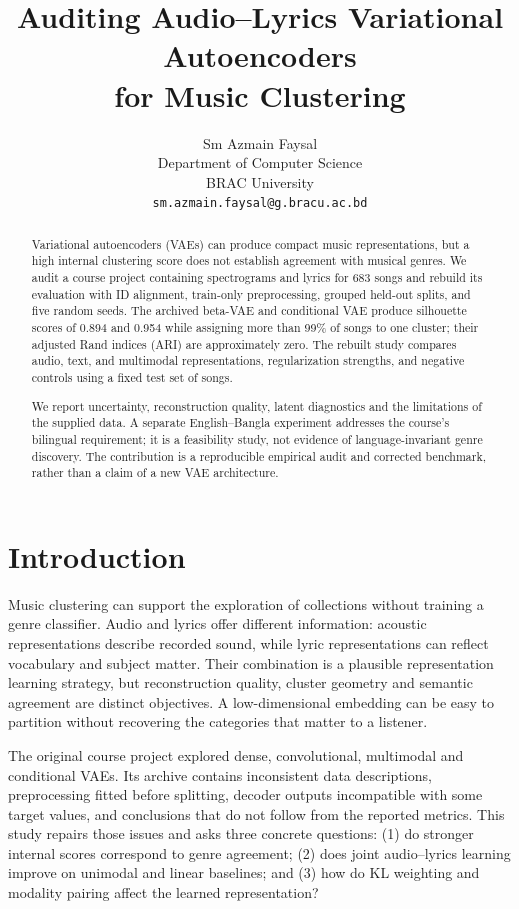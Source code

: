 \documentclass{article}
\title{Auditing Audio--Lyrics Variational Autoencoders\\for Music Clustering}
\author{Sm Azmain Faysal\\Department of Computer Science\\BRAC University\\
\texttt{sm.azmain.faysal@g.bracu.ac.bd}}
\begin{document}
\maketitle
\begin{abstract}
Variational autoencoders (VAEs) can produce compact music representations, but a
high internal clustering score does not establish agreement with musical genres.
We audit a course project containing spectrograms and lyrics for 683 songs and
rebuild its evaluation with ID alignment, train-only preprocessing, grouped
held-out splits, and five random seeds. The archived beta-VAE and conditional
VAE produce silhouette scores of 0.894 and 0.954 while assigning more than 99\%
of songs to one cluster; their adjusted Rand indices (ARI) are approximately
zero. The rebuilt study compares audio, text, and multimodal representations,
regularization strengths, and negative controls using a fixed test set of
\NTest{} songs. 

We report uncertainty, reconstruction quality, latent diagnostics and the
limitations of the supplied data. A separate English--Bangla experiment addresses
the course's bilingual requirement; it is a feasibility study, not evidence of
language-invariant genre discovery. The contribution is a reproducible empirical
audit and corrected benchmark, rather than a claim of a new VAE architecture.
\end{abstract}

\section{Introduction}
Music clustering can support the exploration of collections without training a
genre classifier. Audio and lyrics offer different information: acoustic
representations describe recorded sound, while lyric representations can reflect
vocabulary and subject matter. Their combination is a plausible representation
learning strategy, but reconstruction quality, cluster geometry and semantic
agreement are distinct objectives. A low-dimensional embedding can be easy to
partition without recovering the categories that matter to a listener.

The original course project explored dense, convolutional, multimodal and
conditional VAEs. Its archive contains inconsistent data descriptions,
preprocessing fitted before splitting, decoder outputs incompatible with some
target values, and conclusions that do not follow from the reported metrics.
This study repairs those issues and asks three concrete questions: (1) do stronger
internal scores correspond to genre agreement; (2) does joint audio--lyrics
learning improve on unimodal and linear baselines; and (3) how do KL weighting
and modality pairing affect the learned representation?
\end{document}
